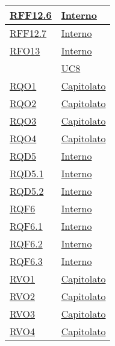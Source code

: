 \begin{longtable}{|>{\centering}m{5cm}|m{5cm}<{\centering}|}
\hyperlink{RFF12.6}{RFF12.6} & \hyperlink{Interno}{Interno}\\ \hline

\hyperlink{RFF12.7}{RFF12.7} & \hyperlink{Interno}{Interno}\\ \hline

\hyperlink{RFO13}{RFO13} & \hyperlink{Interno}{Interno}\\
& \hyperref[UC8]{UC8}\\ \hline

\hyperlink{RQO1}{RQO1} & \hyperlink{Capitolato}{Capitolato}\\ \hline

\hyperlink{RQO2}{RQO2} & \hyperlink{Capitolato}{Capitolato}\\ \hline

\hyperlink{RQO3}{RQO3} & \hyperlink{Capitolato}{Capitolato}\\ \hline

\hyperlink{RQO4}{RQO4} & \hyperlink{Capitolato}{Capitolato}\\ \hline

\hyperlink{RQD5}{RQD5} & \hyperlink{Interno}{Interno}\\ \hline

\hyperlink{RQD5.1}{RQD5.1} & \hyperlink{Interno}{Interno}\\ \hline

\hyperlink{RQD5.2}{RQD5.2} & \hyperlink{Interno}{Interno}\\ \hline

\hyperlink{RQF6}{RQF6} & \hyperlink{Interno}{Interno}\\ \hline

\hyperlink{RQF6.1}{RQF6.1} & \hyperlink{Interno}{Interno}\\ \hline

\hyperlink{RQF6.2}{RQF6.2} & \hyperlink{Interno}{Interno}\\ \hline

\hyperlink{RQF6.3}{RQF6.3} & \hyperlink{Interno}{Interno}\\ \hline

\hyperlink{RVO1}{RVO1} & \hyperlink{Capitolato}{Capitolato}\\ \hline

\hyperlink{RVO2}{RVO2} & \hyperlink{Capitolato}{Capitolato}\\ \hline

\hyperlink{RVO3}{RVO3} & \hyperlink{Capitolato}{Capitolato}\\ \hline

\hyperlink{RVO4}{RVO4} & \hyperlink{Capitolato}{Capitolato}\\ \hline


\end{longtable}
